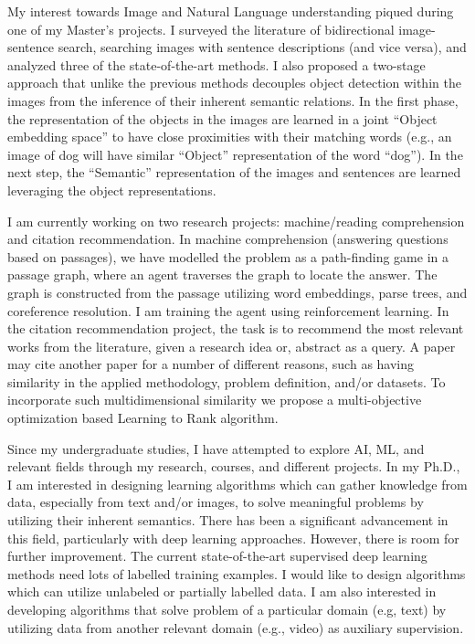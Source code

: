 \documentclass[12pt]{article}
\begin{document}
My interest towards Image and Natural Language understanding piqued during one of my Master's projects. I surveyed the literature of bidirectional image-sentence search, searching images with sentence descriptions (and vice versa), and analyzed three of the state-of-the-art methods. I also proposed a two-stage approach that unlike the previous methods decouples object detection within the images from the inference of their inherent semantic relations. In the first phase, the representation of the objects in the images are learned in a joint ``Object embedding space'' to have close proximities with their matching words (e.g., an image of dog will have similar ``Object'' representation of the word ``dog''). In the next step, the ``Semantic'' representation of the images and sentences are learned leveraging the object representations. 

I am currently working on two research projects: machine/reading comprehension and citation recommendation. In machine comprehension (answering questions based on passages), we have modelled the problem as a path-finding game in a passage graph, where an agent traverses the graph to locate the answer. The graph is constructed from the passage utilizing word embeddings, parse trees, and coreference resolution. I am training the agent using reinforcement learning. In the citation recommendation project, the task is to recommend the most relevant works from the literature, given a research idea or, abstract as a query. A paper may cite another paper for a number of different reasons, such as having similarity in the applied methodology, problem definition, and/or datasets. To incorporate such multidimensional similarity we propose a multi-objective optimization based Learning to Rank algorithm. 

Since my undergraduate studies, I have attempted to explore AI, ML, and relevant fields through my research, courses, and different projects. In my Ph.D., I am interested in designing learning algorithms which can gather knowledge from data, especially from text and/or images, to solve meaningful problems by utilizing their inherent semantics. There has been a significant advancement in this field, particularly with deep learning approaches. However, there is room for further improvement. The current state-of-the-art supervised deep learning methods need lots of labelled training examples. I would like to design algorithms which can utilize unlabeled or partially labelled data. I am also interested in developing algorithms that solve problem of a particular domain (e.g, text) by utilizing data from another relevant domain (e.g., video) as auxiliary supervision.
\end{document}
